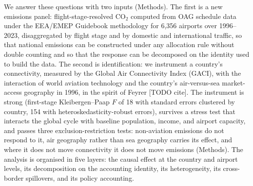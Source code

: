 We answer these questions with two inputs (Methods). The first is a new
emissions panel: flight-stage-resolved CO$_2$ computed from OAG schedule
data under the EEA/EMEP Guidebook methodology for 6{,}356 airports over
1996--2023, disaggregated by flight stage and by domestic and international
traffic, so that national emissions can be constructed under any allocation
rule without double counting and so that the response can be decomposed on
the identity used to build the data. The second is identification: we
instrument a country's connectivity, measured by the Global Air
Connectivity Index (GACI), with the interaction of world aviation
technology and the country's air-versus-sea market-access geography in
1996, in the spirit of Feyrer [TODO cite]. The instrument is strong
(first-stage Kleibergen--Paap $F$ of 18 with standard errors clustered by
country, 154 with heteroskedasticity-robust errors), survives a stress test that
interacts the global cycle with baseline population, income, and airport
capacity, and passes three exclusion-restriction tests: non-aviation
emissions do not respond to it, air geography rather than sea geography
carries its effect, and where it does not move connectivity it does not
move emissions (Methods). The analysis is
organised in five layers: the causal effect at the country and airport
levels, its decomposition on the accounting identity, its heterogeneity,
its cross-border spillovers, and its policy accounting.

